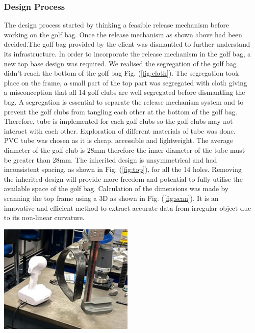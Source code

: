 \documentclass[11pt,landscape]{article}
\newenvironment{Figure}
  {\par\medskip\noindent\minipage{\linewidth}}
  {\endminipage\par\medskip}
\begin{document}
\begin{multicols}{3}
    \subsubsection{Design Process}
    The design process started by thinking a feasible release mechanism before
    working on the golf bag. Once the release mechanism as shown above had been
    decided.The golf bag provided by the client was dismantled to further
    understand its infrastructure. In order to incorporate the release mechanism
    in the golf bag, a new top base design was required. We realised the
    segregation of the golf bag didn't reach the bottom of the golf bag Fig.
    (\ref{fig:cloth}). The segregation took place on the frame, a small part of
    the top part was segregated with cloth giving a misconception that all  14
    golf clubs are well segregated before dismantling the bag. A segregation is
    essential to separate the release mechanism system and to prevent the golf
    clubs from tangling each other at the bottom of the golf bag. Therefore,
    tube is implemented for each golf clubs so the golf clubs may not interact
    with each other. Exploration of different materials of tube was done. PVC
    tube was chosen as it is cheap, accessible and lightweight. The average
    diameter of the golf club is 28mm therefore the inner diameter of the tube
    must be greater than 28mm. The inherited design is unsymmetrical and had
    inconsistent spacing, as shown in Fig. (\ref{fig:top}), for all the 14
    holes. Removing the inherited design will provide more freedom and
    potential to fully utilise the available space of the golf bag. Calculation
    of the dimensions was made by scanning the top frame using a 3D as shown in
     Fig. (\ref{fig:scan}). It is an innovative and efficient method to
    extract accurate data from irregular object due to its non-linear curvature.
    \begin{Figure}
        \begin{center}
            \includegraphics[width=0.5\textwidth]{Figure15.jpg}
            \label{fig:scan}
        \end{center}
    \end{Figure}
    

\end{multicols}
\end{document}
